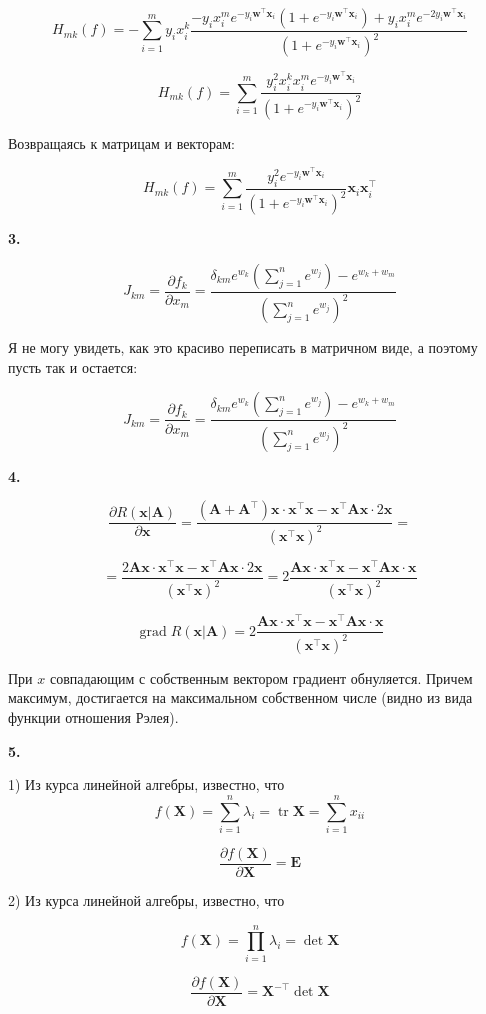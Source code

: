 \documentclass[12pt]{article}
\DeclareMathOperator*{\grad}{grad}
\DeclareMathOperator*{\tr}{tr}
\begin{document}
$$H_{mk}(f) = -\sum\limits_{i=1}^my_ix_i^k\frac{-y_ix_i^me^{-y_i\textbf{w}^\top\textbf{x}_i}(1+e^{-y_i\textbf{w}^\top\textbf{x}_i}) + y_ix_i^me^{-2y_i\textbf{w}^\top\textbf{x}_i}}{(1+e^{-y_i\textbf{w}^\top\textbf{x}_i})^2}$$

$$H_{mk}(f) = \sum\limits_{i=1}^m\frac{y_i^2x_i^kx_i^me^{-y_i\textbf{w}^\top\textbf{x}_i}}{(1+e^{-y_i\textbf{w}^\top\textbf{x}_i})^2}$$

Возвращаясь к матрицам и векторам:

$$\boxed{H_{mk}(f) = \sum\limits_{i=1}^m\frac{y_i^2e^{-y_i\textbf{w}^\top\textbf{x}_i}}{(1+e^{-y_i\textbf{w}^\top\textbf{x}_i})^2}\textbf{x}_i\textbf{x}_i^\top}$$

\begin{center}
	\textbf{3.}
\end{center}

$$J_{km} = \frac{\partial f_k}{\partial x_m} = \frac{\delta_{km}e^{w_k}\left(\sum\limits_{j=1}^ne^{w_j}\right) - e^{w_k+w_m} }{\left(\sum\limits_{j=1}^ne^{w_j}\right)^2}$$

Я не могу увидеть, как это красиво переписать в матричном виде, а поэтому пусть так и остается:

$$\boxed{J_{km} = \frac{\partial f_k}{\partial x_m} = \frac{\delta_{km}e^{w_k}\left(\sum\limits_{j=1}^ne^{w_j}\right) - e^{w_k+w_m} }{\left(\sum\limits_{j=1}^ne^{w_j}\right)^2}}$$

\begin{center}
	\textbf{4.}
\end{center}

$$\frac{\partial R(\textbf{x}|\textbf{A})}{\partial \textbf{x}} = \frac{(\textbf{A} + \textbf{A}^\top)\textbf{x}\cdot\textbf{x}^\top\textbf{x} - \textbf{x}^\top\textbf{Ax} \cdot 2\textbf{x}}{(\textbf{x}^\top\textbf{x})^2}=$$

$$=\frac{2\textbf{A}\textbf{x}\cdot\textbf{x}^\top\textbf{x} - \textbf{x}^\top\textbf{Ax} \cdot 2\textbf{x}}{(\textbf{x}^\top\textbf{x})^2} = 2\frac{\textbf{A}\textbf{x}\cdot\textbf{x}^\top\textbf{x} - \textbf{x}^\top\textbf{Ax} \cdot \textbf{x}}{(\textbf{x}^\top\textbf{x})^2} $$

$$\boxed{\grad R(\textbf{x}|\textbf{A}) =  2\frac{\textbf{A}\textbf{x}\cdot\textbf{x}^\top\textbf{x} - \textbf{x}^\top\textbf{Ax} \cdot \textbf{x}}{(\textbf{x}^\top\textbf{x})^2} }$$

При $x$ совпадающим с собственным вектором градиент обнуляется. Причем максимум, достигается на максимальном собственном числе (видно из вида функции отношения Рэлея).

\begin{center}
	\textbf{5.}
\end{center}

1) Из курса линейной алгебры, известно, что
$$f(\textbf{X}) = \sum\limits_{i=1}^n\lambda_i = \tr \textbf{X} = \sum\limits_{i=1}^nx_{ii}$$

$$\boxed{\frac{\partial f(\textbf{X})}{\partial \textbf{X}} = \textbf{E}}$$

2) Из курса линейной алгебры, известно, что

$$f(\textbf{X}) = \prod\limits_{i=1}^n\lambda_i = \det \textbf{X}$$

$$\boxed{\frac{\partial f(\textbf{X})}{\partial \textbf{X}} = \textbf{X}^{-\top}\det \textbf{X}}$$
\end{document}
